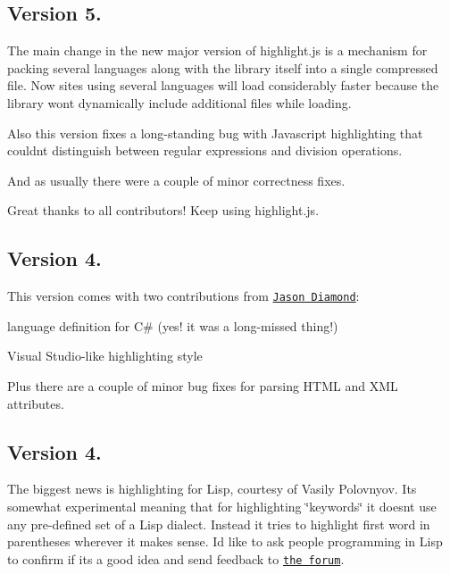 \subsection*{Version 5.}

The main change in the new major version of highlight.\+js is a mechanism for packing several languages along with the library itself into a single compressed file. Now sites using several languages will load considerably faster because the library won\textquotesingle{}t dynamically include additional files while loading.

Also this version fixes a long-\/standing bug with Javascript highlighting that couldn\textquotesingle{}t distinguish between regular expressions and division operations.

And as usually there were a couple of minor correctness fixes.

Great thanks to all contributors! Keep using highlight.\+js.

\subsection*{Version 4.}

This version comes with two contributions from \href{http://jason.diamond.name/weblog/}{\tt Jason Diamond}\+:


\begin{DoxyItemize}
\item language definition for C\# (yes! it was a long-\/missed thing!)
\item Visual Studio-\/like highlighting style
\end{DoxyItemize}

Plus there are a couple of minor bug fixes for parsing H\+T\+ML and X\+ML attributes.

\subsection*{Version 4.}

The biggest news is highlighting for Lisp, courtesy of Vasily Polovnyov. It\textquotesingle{}s somewhat experimental meaning that for highlighting \char`\"{}keywords\char`\"{} it doesn\textquotesingle{}t use any pre-\/defined set of a Lisp dialect. Instead it tries to highlight first word in parentheses wherever it makes sense. I\textquotesingle{}d like to ask people programming in Lisp to confirm if it\textquotesingle{}s a good idea and send feedback to \href{http://softwaremaniacs.org/forum/viewforum.php?id=6}{\tt the forum}.

